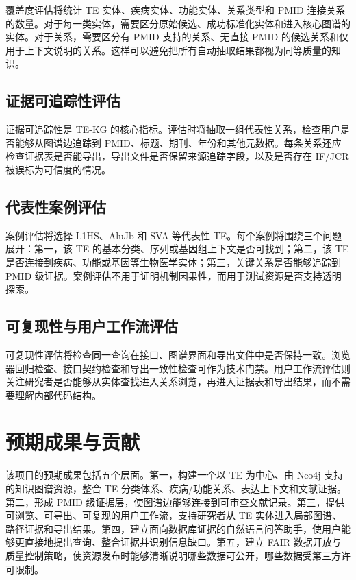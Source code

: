 \documentclass[12pt,a4paper,UTF8]{ctexart}
\begin{document}
覆盖度评估将统计 TE 实体、疾病实体、功能实体、关系类型和 PMID 连接关系的数量。对于每一类实体，需要区分原始候选、成功标准化实体和进入核心图谱的实体。对于关系，需要区分有 PMID 支持的关系、无直接 PMID 的候选关系和仅用于上下文说明的关系。这样可以避免把所有自动抽取结果都视为同等质量的知识。

\subsection{证据可追踪性评估}

证据可追踪性是 TE-KG 的核心指标。评估时将抽取一组代表性关系，检查用户是否能够从图谱边追踪到 PMID、标题、期刊、年份和其他元数据。每条关系还应检查证据表是否能导出，导出文件是否保留来源追踪字段，以及是否存在 IF/JCR 被误标为可信度的情况。

\subsection{代表性案例评估}

案例评估将选择 L1HS、AluJb 和 SVA 等代表性 TE。每个案例将围绕三个问题展开：第一，该 TE 的基本分类、序列或基因组上下文是否可找到；第二，该 TE 是否连接到疾病、功能或基因等生物医学实体；第三，关键关系是否能够追踪到 PMID 级证据。案例评估不用于证明机制因果性，而用于测试资源是否支持透明探索。

\subsection{可复现性与用户工作流评估}

可复现性评估将检查同一查询在接口、图谱界面和导出文件中是否保持一致。浏览器回归检查、接口契约检查和导出一致性检查可作为技术门禁。用户工作流评估则关注研究者是否能够从实体查找进入关系浏览，再进入证据表和导出结果，而不需要理解内部代码结构。

\section{预期成果与贡献}

该项目的预期成果包括五个层面。第一，构建一个以 TE 为中心、由 Neo4j 支持的知识图谱资源，整合 TE 分类体系、疾病/功能关系、表达上下文和文献证据。第二，形成 PMID 级证据层，使图谱边能够连接到可审查文献记录。第三，提供可浏览、可导出、可复现的用户工作流，支持研究者从 TE 实体进入局部图谱、路径证据和导出结果。第四，建立面向数据库证据的自然语言问答助手，使用户能够更直接地提出查询、整合证据并识别信息缺口。第五，建立 FAIR 数据开放与质量控制策略，使资源发布时能够清晰说明哪些数据可公开，哪些数据受第三方许可限制。
\end{document}
